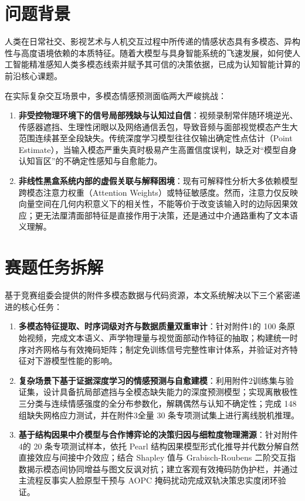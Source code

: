 \documentclass{huawei-mcm}
\begin{document}
\section{问题背景}
人类在日常社交、影视艺术与人机交互过程中所传递的情感状态具有多模态、异构性与高度语境依赖的本质特征\cite{zadeh2018multimodal, tsai2019multimodal}。随着大模型与具身智能系统的飞速发展，如何使人工智能精准感知人类多模态线索并赋予其可信的决策依据，已成为认知智能计算的前沿核心课题。

在实际复杂交互场景中，多模态情感预测面临两大严峻挑战：
\begin{enumerate}[label=\textbf{(\arabic*)}, leftmargin=2.2em]
  \item \textbf{非受控物理环境下的信号局部残缺与认知过自信}：视频录制常伴随环境逆光、传感器遮挡、生理性闭眼以及网络通信丢包，导致音频与面部视觉模态产生大范围连续甚至全段缺失。传统深度学习模型往往仅输出确定性点估计（Point Estimate），当输入模态严重失真时极易产生高置信度误判，缺乏对“模型自身认知盲区”的不确定性感知与自愈能力\cite{sensoy2018evidential, amini2020deep}。
  \item \textbf{非线性黑盒系统内部的虚假关联与解释困境}：现有可解释性分析大多依赖模型跨模态注意力权重（Attention Weights）或特征敏感度。然而，注意力仅反映向量空间在几何内积意义下的相关性，不能等价于改变该输入时的边际因果效应\cite{pearl2009causality}；更无法厘清面部特征是直接作用于决策，还是通过中介通路重构了文本语义理解。
\end{enumerate}

\section{赛题任务拆解}
基于竞赛组委会提供的附件多模态数据与代码资源，本文系统解决以下三个紧密递进的核心任务：
\begin{enumerate}[label=\textbf{任务\arabic*：}, leftmargin=3.5em]
  \item \textbf{多模态特征提取、时序词级对齐与数据质量双重审计}：针对附件1的 100 条原始视频，完成文本语义、声学物理量与视觉面部动作特征的抽取；构建统一时序对齐网格与有效掩码矩阵；制定免训练信号完整性审计体系，并验证对齐特征对下游模型性能的影响。
  \item \textbf{复杂场景下基于证据深度学习的情感预测与自愈建模}：利用附件2训练集与验证集，设计具备抗局部遮挡与全模态缺失能力的深度预测模型；实现离散极性三分类与连续情感强度的全分布参数化，解耦偶然与认知不确定性；完成 148 组缺失网格应力测试，并在附件3全量 30 条专项测试集上进行离线脱机推理。
  \item \textbf{基于结构因果中介模型与合作博弈论的决策归因与细粒度物理溯源}：针对附件4的 20 条专项测试样本，依托 Pearl 结构因果模型形式化推导并代数分解自然直接效应与间接中介效应；结合 Shapley 值与 Grabisch-Roubens 二阶交互指数揭示模态间协同增益与图文反讽对抗；建立客观有效掩码防伪护栏，并通过主流程反事实人脸原型干预与 AOPC 掩码扰动完成双轨决策忠实度闭环验证。
\end{enumerate}
\end{document}
